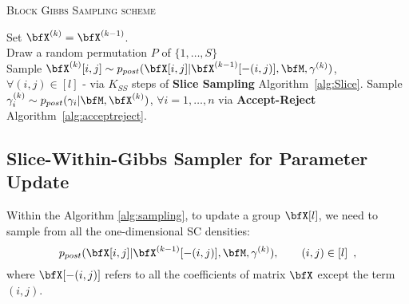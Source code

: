 {\fontsize{4}{4}\selectfont
\begin{algorithm}[t]
\caption{\textsc{Block Gibbs Sampling scheme}}

    {%
    Set $\bfX^{(k)} = \bfX^{(k-1)}$.\\
    		{
    		Draw a random permutation $P$ of $\{1,\ldots,S\}$\\
    			{
			Sample $\bfX^{(k)}[i,j] \sim p_{post}(\bfX[i,j]|\bfX^{(k-1)}[-(i,j)],\bfM,\mathbf{\gamma}^{(k)})$, $\forall (i,j)\in [l]$ - via $K_{SS}$ steps of \textbf{Slice Sampling} Algorithm~\ref{alg:Slice}.
			}
		}
	{Sample $\gamma^{(k)}_{i} \sim p_{post}(\gamma_{i}|\bfM,\bfX^{(k)})$, $\forall i =1,\ldots,n$ via \textbf{Accept-Reject} Algorithm~\ref{alg:acceptreject}.}

    }
\label{alg:sampling}
\end{algorithm}
}


\subsection{Slice-Within-Gibbs Sampler for Parameter Update}\label{sec:DetailsGammaSampler}

Within the Algorithm \ref{alg:sampling}, to update a group $\bfX[l]$, we need to sample from all the one-dimensional SC densities:
\begin{equation}
p_{post}(\bfX[i,j]|\bfX^{(k-1)}[-(i,j)],\bfM,\mathbf{\gamma}^{(k)}), \qquad (i,j) \in [l] \enspace ,
\end{equation}
where $\bfX[-(i,j)]$ refers to all the coefficients of matrix $\bfX$ except the term $(i,j)$.

